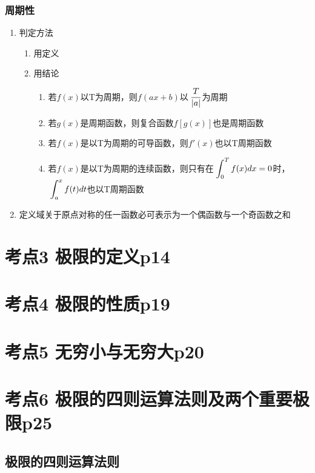 \subsubsection{周期性}

\begin{enumerate}
    \item 判定方法\begin{enumerate}
        \item 用定义
        \item 用结论\begin{enumerate}
            \item 若$f(x)$以T为周期，则$f(ax+b)$以$\displaystyle\hspace{.2em}\frac{T}{|a|}$为周期
            \item 若$g(x)$是周期函数，则复合函数$f[g(x)]$也是周期函数
            \item 若$f(x)$是以T为周期的可导函数，则$f'(x)$也以T周期函数
            \item 若$f(x)$是以T为周期的连续函数，则只有在$\displaystyle\hspace{.2em}\int_{0}^{T}f(x)dx=0$时，$\displaystyle\hspace{.2em}\int_{a}^{x}f(t)dt$也以T周期函数
        \end{enumerate}
    \end{enumerate}
    \item 定义域关于原点对称的任一函数必可表示为一个偶函数与一个奇函数之和
\end{enumerate}

\section{考点3 极限的定义p14}

\section{考点4 极限的性质p19}

\section{考点5 无穷小与无穷大p20}

\section{考点6 极限的四则运算法则及两个重要极限p25}

\subsection{极限的四则运算法则}

